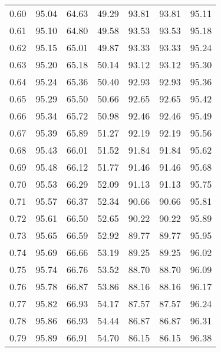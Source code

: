 \begin{tabular}{|c|c|c|c|c|c|c|}
      0.60 &     95.04 &     64.63 &      49.29 &   93.81 &      93.81 &         95.11 \\
      0.61 &     95.10 &     64.80 &      49.58 &   93.53 &      93.53 &         95.18 \\
      0.62 &     95.15 &     65.01 &      49.87 &   93.33 &      93.33 &         95.24 \\
      0.63 &     95.20 &     65.18 &      50.14 &   93.12 &      93.12 &         95.30 \\
      0.64 &     95.24 &     65.36 &      50.40 &   92.93 &      92.93 &         95.36 \\
      0.65 &     95.29 &     65.50 &      50.66 &   92.65 &      92.65 &         95.42 \\
      0.66 &     95.34 &     65.72 &      50.98 &   92.46 &      92.46 &         95.49 \\
      0.67 &     95.39 &     65.89 &      51.27 &   92.19 &      92.19 &         95.56 \\
      0.68 &     95.43 &     66.01 &      51.52 &   91.84 &      91.84 &         95.62 \\
      0.69 &     95.48 &     66.12 &      51.77 &   91.46 &      91.46 &         95.68 \\
      0.70 &     95.53 &     66.29 &      52.09 &   91.13 &      91.13 &         95.75 \\
      0.71 &     95.57 &     66.37 &      52.34 &   90.66 &      90.66 &         95.81 \\
      0.72 &     95.61 &     66.50 &      52.65 &   90.22 &      90.22 &         95.89 \\
      0.73 &     95.65 &     66.59 &      52.92 &   89.77 &      89.77 &         95.95 \\
      0.74 &     95.69 &     66.66 &      53.19 &   89.25 &      89.25 &         96.02 \\
      0.75 &     95.74 &     66.76 &      53.52 &   88.70 &      88.70 &         96.09 \\
      0.76 &     95.78 &     66.87 &      53.86 &   88.16 &      88.16 &         96.17 \\
      0.77 &     95.82 &     66.93 &      54.17 &   87.57 &      87.57 &         96.24 \\
      0.78 &     95.86 &     66.93 &      54.44 &   86.87 &      86.87 &         96.31 \\
      0.79 &     95.89 &     66.91 &      54.70 &   86.15 &      86.15 &         96.38 \\

\end{tabular}
